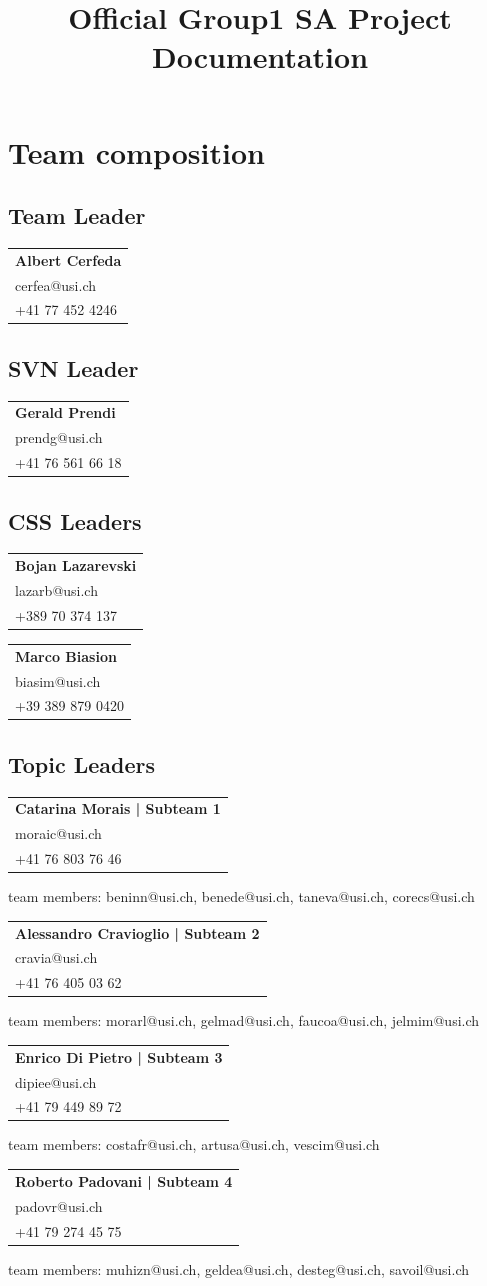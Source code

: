 \documentclass[a4paper,10pt]{article}
\title{Official Group1 SA Project Documentation}
\date{}
\newcommand{\idcard}[3]{
    \vspace{-0.3cm}
    \begin{table}[h!]
     \begin{tabular}{|l|}
        \hline
        \textbf{#1} \\
        #2 \\
        #3\\
        \hline
     \end{tabular}
    \end{table}
    \vspace{-0.3cm}
}
\begin{document}
\maketitle
\tableofcontents
\newpage

\section{Team composition}

    \subsection{Team Leader}
        \idcard{Albert Cerfeda}{cerfea@usi.ch}{+41 77 452 4246}
    \subsection{SVN Leader}
        \idcard{Gerald Prendi}{prendg@usi.ch}{+41 76 561 66 18}
        
    \subsection{CSS Leaders}
        \idcard{Bojan Lazarevski}{lazarb@usi.ch}{+389 70 374 137}
        \idcard{Marco Biasion}{biasim@usi.ch}{+39 389 879 0420}
        
    \subsection{Topic Leaders}
        \label{topicleaders}
        \idcard{Catarina Morais | \textbf{Subteam 1}}{moraic@usi.ch}{+41 76 803 76 46}
        team members: beninn@usi.ch, benede@usi.ch, taneva@usi.ch, corecs@usi.ch\newline
        
        \idcard{Alessandro Cravioglio | \textbf{Subteam 2}}{cravia@usi.ch}{+41 76 405 03 62}
        team members: morarl@usi.ch, gelmad@usi.ch, faucoa@usi.ch, jelmim@usi.ch\newline 
        
        \idcard{Enrico Di Pietro | \textbf{Subteam 3}}{dipiee@usi.ch}{+41 79 449 89 72}
        team members: costafr@usi.ch, artusa@usi.ch, vescim@usi.ch\newline
        
        \idcard{Roberto Padovani | \textbf{Subteam 4}}{padovr@usi.ch}{+41 79 274 45 75}
        team members: muhizn@usi.ch, geldea@usi.ch, desteg@usi.ch, savoil@usi.ch\newline
        
\end{document}
